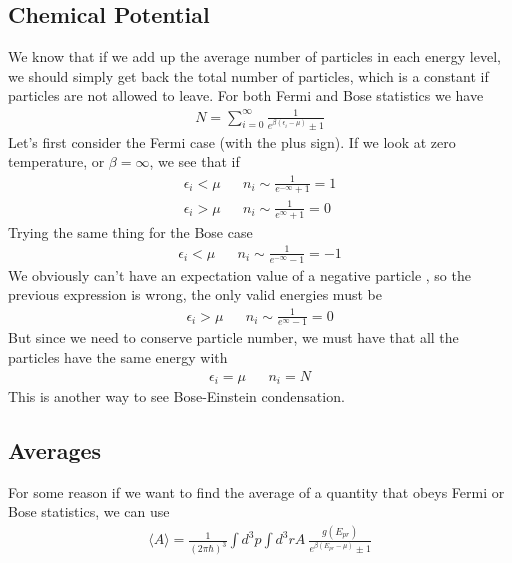 \subsection{Chemical Potential}
We know that if we add up the average number of particles in each energy level, we should simply get back the total number of particles, which is a constant if particles are not allowed to leave. For both Fermi and Bose statistics we have
\begin{align}
    N = \sum_{i=0}^\infty \frac{1}{e^{\beta(\epsilon_i - \mu)} \pm 1}
\end{align}
 Let's first consider the Fermi case (with the plus sign). If we look at zero temperature, or $\beta = \infty$, we see that if 
\begin{align}
    \epsilon_i < \mu  && n_i \sim \frac{1}{e^{-\infty} +1} = 1\\
    \epsilon_i > \mu  && n_i \sim \frac{1}{e^{\infty} +1} = 0
\end{align}
Trying the same thing for the Bose case
\begin{align}
    \epsilon_i < \mu  && n_i \sim \frac{1}{e^{-\infty} -1} = -1
\end{align}
We obviously can't have an expectation value of a negative particle
, so the previous expression is wrong, the only valid energies must be
\begin{align}
    \epsilon_i > \mu && n_i\sim \frac{1}{e^{\infty} -1} = 0
\end{align}
But since we need to conserve particle number, we must have that all the particles  have the same energy with
\begin{align}
    \epsilon_i = \mu && n_i = N
\end{align}
This is another way to see Bose-Einstein condensation. %


\subsection{Averages}
For some reason if we want to find the average of a quantity that obeys Fermi or Bose statistics, we can use
\begin{align}
    \langle A \rangle = \frac{1}{(2\pi\hbar)^3}\int d^3p \int d^3r A~\frac{g(E_{pr})}{e^{\beta(E_{pr} - \mu)}\pm 1}
\end{align}

